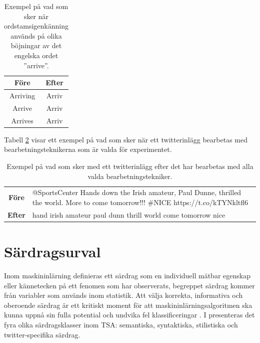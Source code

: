 \documentclass{kaumasters} %
\begin{document}
\begin{table}[H]
\centering
\caption{Exempel på vad som sker när ordstamsigenkänning används på olika böjningar av det engelska ordet ''arrive''.}
\label{tab:stemming}
    \begin{tabular}{cc}
 	\toprule
    \textbf{Före} & \textbf{Efter} \\
    \midrule
    Arriving & Arriv \\
    Arrive & Arriv \\
    Arrives & Arriv \\
    \bottomrule
\end{tabular}
\end{table}

Tabell \ref{tab:preproc} visar ett exempel på vad som sker när ett twitterinlägg bearbetas med bearbetningsteknikerna som är valda för experimentet. 

\begin{table}[H]
\centering
\caption{Exempel på vad som sker med ett twitterinlägg efter det har bearbetas med alla valda bearbetningstekniker.}
\label{tab:preproc}
    \begin{tabularx}{\textwidth}{cX}
    \toprule
    \textbf{Före}&  {@SportsCenter Hands down the Irish amateur, Paul Dunne, thrilled the world. More to come tomorrow!!! \#NICE https://t.co/kTYNkltfl6} \\
\textbf{Efter}& hand irish amateur paul dunn thrill world come tomorrow nice \\
    \bottomrule
\end{tabularx}
\end{table}





\section{Särdragsurval} \label{exp:feat}
Inom maskininlärning definieras ett särdrag som en individuell mätbar egenskap eller kännetecken på ett fenomen som har observerats, begreppet särdrag kommer från variabler som används inom statistik. Att välja korrekta, informativa och oberoende särdrag är ett kritiskt moment för att maskininlärningsalgoritmen ska kunna uppnå sin fulla potential och undvika fel klassificeringar \cite{wiki:014}. 
I \cite{TSAsurvey} presenteras det fyra olika särdragsklasser inom TSA: semantiska, syntaktiska, stilistiska och twitter-specifika särdrag.
\end{document}
